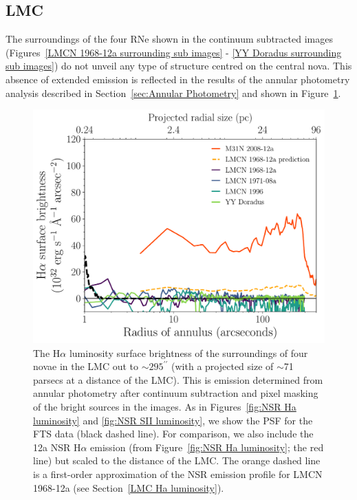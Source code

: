 \documentclass[fleqn,usenatbib]{mnras}
\begin{document}
\subsection{LMC}\label{sec:Results LMC}
The surroundings of the four RNe shown in the continuum subtracted images (Figures~\ref{LMCN 1968-12a surrounding sub images} - \ref{YY Doradus surrounding sub images}) do not unveil any type of structure centred on the central nova. This absence of extended emission is reflected in the results of the annular photometry analysis described in Section~\ref{sec:Annular Photometry} and shown in Figure~\ref{fig:NSR Ha luminosity LMC}.
\begin{figure}
\includegraphics[width=\columnwidth]{Figures/LMC_NSR_Radial_Ha_Luminosity_All.pdf}
\caption{The H$\alpha$ luminosity surface brightness of the surroundings of four novae in the LMC out to ${\sim}295^{\prime \prime}$ (with a projected size of $\sim$71 parsecs at a distance of the LMC). This is emission determined from annular photometry after continuum subtraction and pixel masking of the bright sources in the images. As in Figures~\ref{fig:NSR Ha luminosity} and \ref{fig:NSR SII luminosity}, we show the PSF for the FTS data (black dashed line). For comparison, we also include the 12a NSR H$\alpha$ emission (from Figure~\ref{fig:NSR Ha luminosity}; the red line) but scaled to the distance of the LMC. The orange dashed line is a first-order approximation of the NSR emission profile for LMCN 1968-12a (see Section~\ref{LMC Ha luminosity}).}
\label{fig:NSR Ha luminosity LMC}
\end{figure}
\end{document}
